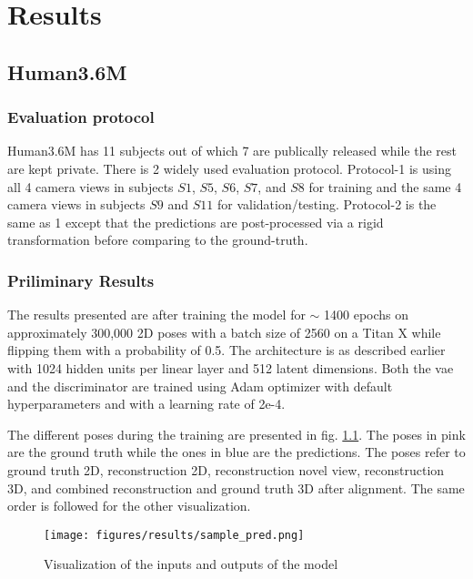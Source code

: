 \chapter{Results} %
\label{chap:results}
\section{Human3.6M}
\subsection{Evaluation protocol}
Human3.6M has 11 subjects out of which 7 are publically released while the rest are kept private. There is 2 widely used evaluation protocol. Protocol-1 is using all 4 camera views in subjects $S1$, $S5$, $S6$, $S7$, and $S8$ for training and the same 4 camera views in subjects $S9$ and $S11$ for validation/testing. Protocol-2 is the same as 1 except that the predictions are post-processed via a rigid transformation
before comparing to the ground-truth.


\subsection{Priliminary Results}

The results presented are after training the model for $\sim$ 1400 epochs on approximately 300,000 2D poses with a batch size of 2560 on a Titan X while flipping them with a probability of 0.5. The architecture is as described earlier with 1024 hidden units per linear layer and 512 latent dimensions. Both the \ac{vae} and the discriminator are trained using Adam optimizer with default hyperparameters and with a learning rate of 2e-4. 

The different poses during the training are presented in fig. \ref{fig:sample_pred}. The poses in pink are the ground truth while the ones in blue are the predictions. The poses refer to ground truth 2D, reconstruction 2D, reconstruction novel view, reconstruction 3D, and combined reconstruction and ground truth 3D after alignment. The same order is followed for the other visualization. 

\begin{figure}[!h]
    \centering
    \texttt{[image: figures/results/sample\_pred.png]}
    \caption{Visualization of the inputs and outputs of the model}
    \label{fig:sample_pred}
\end{figure}

